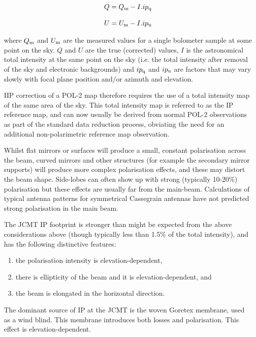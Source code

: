 \begin{equation}
Q = Q_{\textnormal{m}} - I. ip_{\textnormal{q}}
\end{equation}

\begin{equation}
U = U_{\textnormal{m}} - I. ip_{\textnormal{u}}
\end{equation}

where $Q_{\textnormal{m}}$ and $U_{\textnormal{m}}$ are the measured values for a single
bolometer sample at some point on the sky. $Q$ and $U$ are the true
(corrected) values, $I$ is the astronomical total intensity at the same
point on the sky (i.e. the total intensity after removal of the sky
and electronic backgrounds) and $ip_{\textnormal{q}}$ and $ip_{\textnormal{u}}$
are factors that may vary slowly with focal plane position and/or azimuth and
elevation.

IIP correction of a POL-2 map therefore requires the use of a total intensity map
of the same area of the sky. This total intensity map is referred to as the IP reference
map, and can now usually be derived from normal POL-2 observations as part of the
standard data reduction process, obviating the need for an additional non-polarimetric
reference map observation.

Whilst flat mirrors or surfaces will produce a small, constant
polarisation across the beam, curved mirrors and other structures (for
example the secondary mirror supports) will produce more complex
polarisation effects, and these may distort the beam shape.
Side-lobes can often show up with strong (typically 10-20\%)
polarisation but these effects are usually far from the
main-beam. Calculations of typical antenna patterns for symmetrical
Cassegrain antennas have not predicted strong polarisation in the main
beam.

The JCMT IP footprint is stronger than might be expected from the
above considerations above (though typically less than 1.5\% of the
total intensity), and has the following distinctive features:

\begin{enumerate}
\item the polarisation intensity is elevation-dependent,
\item there is ellipticity of the beam and it is elevation-dependent, and
\item the beam is elongated in the horizontal direction.
\end{enumerate}

The dominant source of IP at the JCMT is the woven Goretex membrane,
used as a wind blind.  This membrane introduces both losses and
polarisation. This effect is elevation-dependent.


